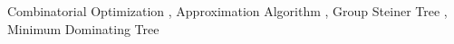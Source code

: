 Combinatorial Optimization
\sep
Approximation Algorithm
\sep
Group Steiner Tree
\sep
Minimum Dominating Tree
